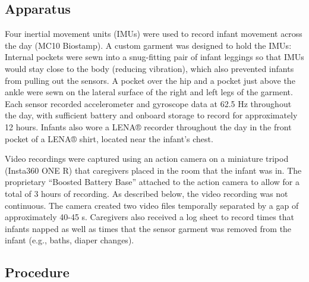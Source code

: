\documentclass[
  man]{apa6}
\begin{document}
\hypertarget{apparatus}{%
\subsection{Apparatus}\label{apparatus}}

Four inertial movement units (IMUs) were used to record infant movement across the day (MC10 Biostamp). A custom garment was designed to hold the IMUs: Internal pockets were sewn into a snug-fitting pair of infant leggings so that IMUs would stay close to the body (reducing vibration), which also prevented infants from pulling out the sensors. A pocket over the hip and a pocket just above the ankle were sewn on the lateral surface of the right and left legs of the garment. Each sensor recorded accelerometer and gyroscope data at 62.5 Hz throughout the day, with sufficient battery and onboard storage to record for approximately 12 hours. Infants also wore a LENA® recorder throughout the day in the front pocket of a LENA® shirt, located near the infant's chest.

Video recordings were captured using an action camera on a miniature tripod (Insta360 ONE R) that caregivers placed in the room that the infant was in. The proprietary ``Boosted Battery Base'' attached to the action camera to allow for a total of 3 hours of recording. As described below, the video recording was not continuous. The camera created two video files temporally separated by a gap of approximately 40-45 s. Caregivers also received a log sheet to record times that infants napped as well as times that the sensor garment was removed from the infant (e.g., baths, diaper changes).

\hypertarget{procedure}{%
\subsection{Procedure}\label{procedure}}
\end{document}
